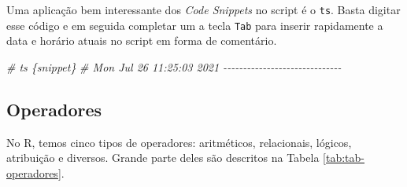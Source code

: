 \documentclass[
]{book}
\newenvironment{Shaded}{\begin{snugshade}}{\end{snugshade}}
\newcommand{\CommentTok}[1]{\textcolor[rgb]{0.37,0.37,0.37}{\textit{#1}}}
\begin{document}
Uma aplicação bem interessante dos \emph{Code Snippets} no script é o \texttt{ts}. Basta digitar esse código e em seguida completar um a tecla \texttt{Tab} para inserir rapidamente a data e horário atuais no script em forma de comentário.

\begin{Shaded}
\begin{Highlighting}[]
\CommentTok{\# ts \{snippet\}}
\CommentTok{\# Mon Jul 26 11:25:03 2021 {-}{-}{-}{-}{-}{-}{-}{-}{-}{-}{-}{-}{-}{-}{-}{-}{-}{-}{-}{-}{-}{-}{-}{-}{-}{-}{-}{-}{-}{-}}
\end{Highlighting}
\end{Shaded}

\hypertarget{operadores}{%
\subsection{Operadores}\label{operadores}}

No R, temos cinco tipos de operadores: aritméticos, relacionais, lógicos, atribuição e diversos. Grande parte deles são descritos na Tabela \ref{tab:tab-operadores}.
\end{document}
